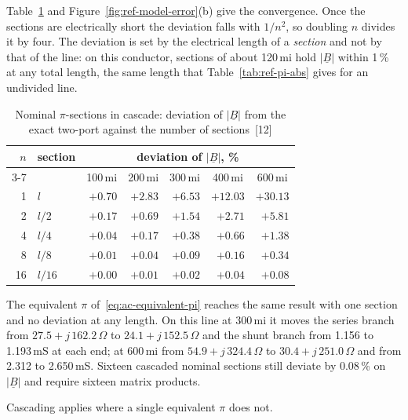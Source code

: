 Table~\ref{tab:ref-cascade} and Figure~\ref{fig:ref-model-error}(b) give
the convergence. Once the sections are electrically short the deviation
falls with $1/n^2$, so doubling $n$ divides it by four. The deviation is set
by the electrical length of a \emph{section} and not by that of the line: on
this conductor, sections of about 120\,mi hold
$\left|\underline{B}\right|$ within 1\,\% at any total length, the same
length that Table~\ref{tab:ref-pi-abs} gives for an undivided line.

\begin{table}[!ht]
  \centering
  \begin{tabular}{@{}r l r r r r r@{}}
    \toprule
    \textbf{$n$} & \textbf{section}
      & \multicolumn{5}{c}{deviation of $\left|\underline{B}\right|$, \%} \\
    \cmidrule(lr){3-7}
    & & \multicolumn{1}{c}{100\,mi} & \multicolumn{1}{c}{200\,mi}
      & \multicolumn{1}{c}{300\,mi} & \multicolumn{1}{c}{400\,mi}
      & \multicolumn{1}{c}{600\,mi} \\
    \midrule
     1 & $l$      & $+0.70$ & $+2.83$ & $+6.53$ & $+12.03$ & $+30.13$ \\
     2 & $l/2$    & $+0.17$ & $+0.69$ & $+1.54$ &  $+2.71$ &  $+5.81$ \\
     4 & $l/4$    & $+0.04$ & $+0.17$ & $+0.38$ &  $+0.66$ &  $+1.38$ \\
     8 & $l/8$    & $+0.01$ & $+0.04$ & $+0.09$ &  $+0.16$ &  $+0.34$ \\
    16 & $l/16$   & $+0.00$ & $+0.01$ & $+0.02$ &  $+0.04$ &  $+0.08$ \\
    \bottomrule
  \end{tabular}
  \caption{Nominal $\pi$-sections in cascade: deviation of
           $\left|\underline{B}\right|$ from the exact two-port against the
           number of sections~[12]}
  \label{tab:ref-cascade}
\end{table}

The equivalent $\pi$ of~\eqref{eq:ac-equivalent-pi} reaches the same result
with one section and no deviation at any length. On this line at 300\,mi it
moves the series branch from $27.5 + j\,162.2\,\Omega$ to $24.1 +
j\,152.5\,\Omega$ and the shunt branch from 1.156 to 1.193\,mS at each end;
at 600\,mi from $54.9 + j\,324.4\,\Omega$ to $30.4 + j\,251.0\,\Omega$ and
from 2.312 to 2.650\,mS. Sixteen cascaded nominal sections still deviate by
0.08\,\% on $\left|\underline{B}\right|$ and require sixteen matrix
products.

Cascading applies where a single equivalent $\pi$ does not.

